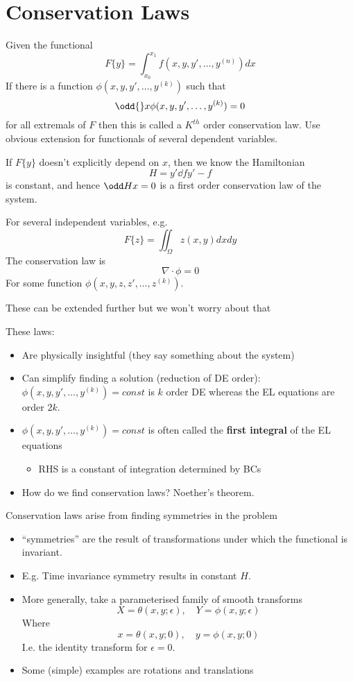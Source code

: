 \documentclass{E:/Documents/Latex/myassignment}
\begin{document}
\section{Conservation Laws}
Given the functional
\[F\{y\} = \int_{x_0}^{x_1} f(x,y,y',\ldots,y^{(n)}) dx\]
If there is a function $\phi(x,y,y',\ldots, y^{(k)})$ such that
\[\odd{}x \phi(x,y,y',\ldots,y^{(k)}) = 0\]
for all extremals of $F$ then this is called a $K^{th}$ order conservation law.
Use obvious extension for functionals of several dependent variables.



If $F\{y\}$ doesn't explicitly depend on $x$, then we know the Hamiltonian 
\[H = y' \dd f{y'} - f\]
is constant, and hence $\odd Hx = 0$ is a first order conservation law of the system.

For several independent variables, e.g.
\[F\{z\} = \iint_{\Omega} z(x,y) dxdy\]
The conservation law is
\[\nabla \cdot \phi = 0\]
For some function $\phi(x,y,z,z',\ldots,z^{(k)})$.

These can be extended further but we won't worry about that



These laws:
\begin{itemize}
	\item Are physically insightful (they say something about the system)
	\item Can simplify finding a solution (reduction of DE order): $\phi(x,y,y',\ldots,y^{(k)}) = const$ is $k$ order DE whereas the EL equations are order $2k$.
	\item $\phi(x,y,y',\ldots,y^{(k)}) = const$ is often called the \textbf{first integral} of the EL equations
	\begin{itemize}
		\item RHS is a constant of integration determined by BCs
	\end{itemize}
	\item How do we find conservation laws? Noether's theorem.
\end{itemize}

Conservation laws arise from finding symmetries in the problem
\begin{itemize}
	\item ``symmetries'' are the result of transformations under which the functional is invariant. 
	\item E.g. Time invariance symmetry results in constant $H$.
	\item More generally, take a parameterised family of smooth transforms
	\[X = \theta(x,y; \epsilon), \quad Y = \phi(x,y; \epsilon)\]
	Where
	\[x = \theta(x,y;0), \quad y = \phi(x,y;0)\]
	I.e. the identity transform for $\epsilon = 0$.
	\item Some (simple) examples are rotations and translations
\end{itemize}
\end{document}
